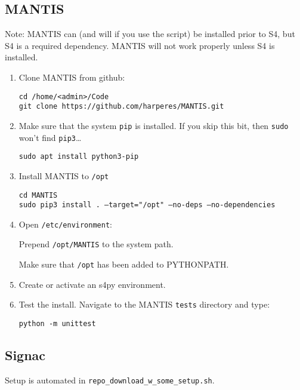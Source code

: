 \subsection{MANTIS} \label{subsec:installMANTIS}

Note: MANTIS can (and will if you use the script) be installed prior to S4, but S4 is a required dependency. MANTIS will not work properly unless S4 is installed.

\begin{enumerate}
\item Clone MANTIS from github:

	\texttt{cd /home/<admin>/Code} \\
	\texttt{git clone https://github.com/harperes/MANTIS.git}

\item Make sure that the system \texttt{pip} is installed. If you skip this bit, then \texttt{sudo} won't find \texttt{pip3}\dots

	\texttt{sudo apt install python3-pip}

\item Install MANTIS to \texttt{/opt}

\texttt{cd MANTIS} \\
\texttt{sudo pip3 install . --target="/opt" --no-deps --no-dependencies}

\item Open \texttt{/etc/environment}:

	Prepend \texttt{/opt/MANTIS} to the system path.
	
	Make sure that \texttt{/opt} has been added to PYTHONPATH.

\item Create or activate an s4py environment. 

\item Test the install. Navigate to the MANTIS \texttt{tests} directory and type:
	
	\texttt{python -m unittest}

\end{enumerate}

\subsection{Signac} \label{subsec:installSignac}

Setup is automated in \texttt{repo\_download\_w\_some\_setup.sh}.

